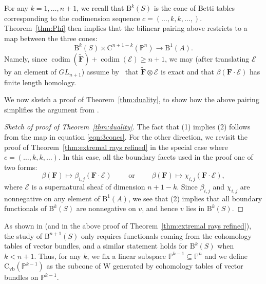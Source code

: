 \documentclass[12pt]{amsart}
\theoremstyle{definition}
\theoremstyle{remark}
\newcommand{\codim}{\operatorname{codim}}
\newcommand{\PP}{\mathbb{P}}
\newcommand{\WW}{\mathrm{W}}
\newcommand{\cc}{c}
\newcommand{\cE}{\mathcal{E}}
\newcommand{\FF}{\mathbf{F}}
\newcommand{\GL}{{GL}}
\newcommand{\CQ}{\mathrm{C}}
\newcommand{\CvbQ}{\mathrm{C}_{\text{vb}}}
\newcommand{\BBQ}{\mathrm{B}}
\begin{document}
For any $k=1, \dots, n+1$, we recall that $\BBQ^k(S)$ is the cone of Betti tables corresponding to the codimension sequence $\cc=(\dots,k,k,\dots,)$.
Theorem~\ref{thm:Phi} then implies that the bilinear pairing above restricts to a map between the three cones:
\begin{equation}\label{eqn:3cones}
\BBQ^{k}(S)\times \CQ^{n+1-k}(\PP^n)\to \BBQ^1(A).
\end{equation}
Namely, since $\codim(\widetilde{\FF})+\codim(\cE)\geq n+1$, we may (after translating $\cE$ by an element of $\GL_{n+1}$) assume by~\cite[Theorem, p. 335]{miller-speyer} that $\widetilde{\FF}\otimes \cE$ is exact and that $\beta(\FF\cdot \cE)$ has finite length homology.

We now sketch a proof of Theorem~\ref{thm:duality}, to show how the above pairing simplifies the argument from \cite{eis-schrey1}.
\begin{proof}[Sketch of proof of Theorem~\ref{thm:duality}]
The fact that (1) implies (2) follows from the map in equation \eqref{eqn:3cones}. For the other direction, we revisit the proof of Theorem~\ref{thm:extremal rays refined} in the special case where $\cc=(\dots, k,k,\dots)$.  In this case, all the boundary facets used in the proof one of two forms:
\[
\beta(\FF)\mapsto\beta_{i,j}(\FF\cdot \cE) \qquad \text{ or } \qquad \beta(\FF)\mapsto\chi_{i,j}(\FF\cdot \cE),
\]
where $\cE$ is a supernatural sheaf of dimension $n+1-k$.  Since $\beta_{i,j}$ and $\chi_{i,j}$ are nonnegative on any element of $\BBQ^1(A)$, we see that (2) implies that all boundary functionals of $\BBQ^k(S)$ are nonnegative on $v$, and hence $v$ lies in $\BBQ^k(S)$.
\end{proof}
As shown in \cite{eis-schrey1} (and in the above proof of Theorem~\ref{thm:extremal rays refined}), the study of $\BBQ^{n+1}(S)$ only requires functionals coming from the cohomology tables of vector bundles, and a similar statement holds for $\BBQ^{k}(S)$ when $k<n+1$.  Thus, for any $k$, we fix a linear subspace $\PP^{k-1}\subseteq \PP^n$ and we define $\CvbQ(\PP^{k-1})$ as the subcone of $\WW$ generated by cohomology tables of vector bundles on $\PP^{k-1}$.
\end{document}
